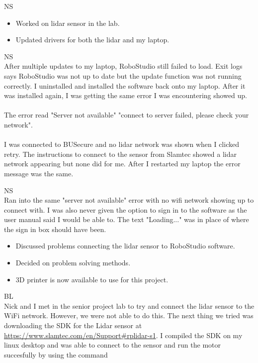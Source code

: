 \documentclass[fontsize=11pt, %
                             paper=a4, %
                             twoside, %
                             captions=tableheading,
                             index=totoc,
                             hyperref]{labbook}
\begin{document}
\begin{addmargin}[0cm]{0cm}
NS\\
\begin{itemize}
\item Worked on lidar sensor in the lab.
\item Updated drivers for both the lidar and my laptop.
\end{itemize}


NS\\
After multiple updates to my laptop, RoboStudio still failed to load. Exit logs says RoboStudio was not up to date but the update function was not running correctly. I uninstalled and installed the software back onto my laptop. After it was installed again, I was getting the same error I was encountering showed up.\\
\\
The error read "Server not available" "connect to server failed, please check your network".\\ 
\\
I was connected to BUSecure and no lidar network was shown when I clicked retry. The instructions to connect to the sensor from Slamtec showed a lidar network appearing but none did for me. After I restarted my laptop the error message was the same.


NS\\
Ran into the same "server not available" error with no wifi network showing up to connect with. I was also never given the option to sign in to the software as the user manual said I would be able to. The text "Loading..." was in place of where the sign in box should have been.


\begin{itemize}
\item Discussed problems connecting the lidar sensor to RoboStudio software.
\item Decided on problem solving methods.
\item 3D printer is now available to use for this project.
\end{itemize}

BL\\
Nick and I met in the senior project lab to try and connect the lidar sensor to the WiFi network. However, we were not able to do this. The next thing we tried was downloading the SDK for the Lidar sensor at \url{https://www.slamtec.com/en/Support#rplidar-s1}. I compiled the SDK on my linux desktop and was able to connect to the sensor and run the motor succesfully by using the command


\end{addmargin}
\end{document}
